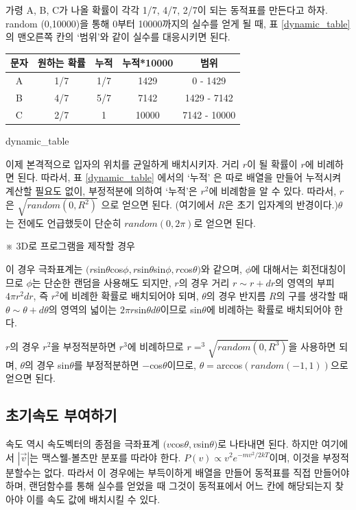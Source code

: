 \documentclass{gshs-hutech}
\begin{document}
가령 A, B, C가 나올 확률이 각각 1/7, 4/7, 2/7이 되는 동적표를 만든다고 하자. random (0,10000)을 통해 0부터 10000까지의 실수를 얻게 될 때, 표 \ref{dynamic_table}의 맨오른쪽 칸의 ‘범위’와 같이 실수를 대응시키면 된다.

\begin{table}[h]
	\begin{center}
		\begin{tabular}{|c|c|c|c|c|}
			\hline
			문자&원하는 확률&누적&누적*10000&범위\\
			\hline
			A&1/7&1/7&1429&0 - 1429\\
			\hline
			B&4/7&5/7&7142&1429 - 7142\\
			\hline
			C&2/7&1&10000&7142 - 10000\\
			\hline
		\end{tabular}
		
		dynamic\_table
	\end{center}
\end{table} 

이제 본격적으로 입자의 위치를 균일하게 배치시키자. 거리 $r$이 될 확률이 $r$에 비례하면 된다. 따라서, 표 \ref{dynamic_table} 에서의 ‘누적’ 은 따로 배열을 만들어 누적시켜 계산할 필요도 없이, 부정적분에 의하여 ‘누적’은 $r^2$에 비례함을 알 수 있다. 따라서, 
$r$은 $\sqrt{random(0,R^2)}$ 으로 얻으면 된다. (여기에서 $R$은 초기 입자계의 반경이다.)$\theta$는 전에도 언급했듯이 단순히 $random(0,2\pi)$로 얻으면 된다.

※ 3D로 프로그램을 제작할 경우

이 경우 극좌표계는 $(r$sin$\theta $cos$\phi,r$sin$\theta $sin$\phi, r$cos$\theta)$와 같으며, $\phi$에 대해서는 회전대칭이므로 $\phi$는 단순한 랜덤을 사용해도 되지만, $r$의 경우 거리 $r \sim r+dr$의 영역의 부피 $4\pi r^2 dr$, 즉 $r^2$에 비례한 확률로 배치되어야 되며, $\theta$의 경우 반지름 $R$의 구를 생각할 때 $\theta \sim \theta + d\theta$의 영역의 넓이는 $2\pi r$sin$\theta d\theta$이므로 sin$\theta$에 비례하는 확률로 배치되어야 한다.

$r$의 경우 $r^2$을 부정적분하면 $r^3$에 비례하므로 $r=^3 \sqrt{random(0,R^3)}$을 사용하면 되며, $\theta$의 경우 sin$\theta$를 부정적분하면 $-$cos$\theta$이므로, $\theta = $arccos$(random(-1,1))$으로 얻으면 된다.

\subsection{초기속도 부여하기}

속도 역시 속도벡터의 종점을 극좌표계 $(v$cos$\theta,v$sin$\theta)$로 나타내면 된다. 하지만 여기에서 $|\vec{v}|$는 맥스웰-볼츠만 분포를 따라야 한다. $P(v)\propto v^2 e^{-mv^2 / 2kT}$이며, 이것을 부정적분할수는 없다. 따라서 이 경우에는 부득이하게 배열을 만들어 동적표를 직접 만들어야 하며, 랜덤함수를 통해 실수를 얻었을 때 그것이 동적표에서 어느 칸에 해당되는지 찾아야 이를 속도 값에 배치시킬 수 있다.
\end{document}
